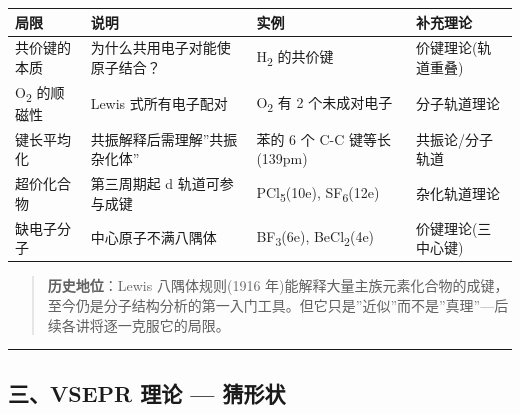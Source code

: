 {\def\LTcaptype{none} %
\begin{longtable}[]{@{}
  >{\raggedright\arraybackslash}p{}
  >{\raggedright\arraybackslash}p{}
  >{\raggedright\arraybackslash}p{}
  >{\centering\arraybackslash}p{}@{}}
\toprule\noalign{}
\begin{minipage}[b]{\linewidth}\raggedright
局限
\end{minipage} & \begin{minipage}[b]{\linewidth}\raggedright
说明
\end{minipage} & \begin{minipage}[b]{\linewidth}\raggedright
实例
\end{minipage} & \begin{minipage}[b]{\linewidth}\centering
补充理论
\end{minipage} \\
\midrule\noalign{}
\endhead
\bottomrule\noalign{}
\endlastfoot
共价键的本质 & 为什么共用电子对能使原子结合？ & H\textsubscript{2} 的共价键 & 价键理论(轨道重叠) \\
O\textsubscript{2} 的顺磁性 & Lewis 式所有电子配对 & O\textsubscript{2} 有 2 个未成对电子 & 分子轨道理论 \\
键长平均化 & 共振解释后需理解''共振杂化体'' & 苯的 6 个 C-C 键等长(139pm) & 共振论/分子轨道 \\
超价化合物 & 第三周期起 d 轨道可参与成键 & PCl\textsubscript{5}(10e), SF\textsubscript{6}(12e) & 杂化轨道理论 \\
缺电子分子 & 中心原子不满八隅体 & BF\textsubscript{3}(6e), BeCl\textsubscript{2}(4e) & 价键理论(三中心键) \\
\end{longtable}
}

\begin{quote}
\textbf{历史地位}：Lewis 八隅体规则(1916 年)能解释大量主族元素化合物的成键，至今仍是分子结构分析的第一入门工具。但它只是''近似''而不是''真理''---后续各讲将逐一克服它的局限。
\end{quote}

\begin{center}\rule{0.5\linewidth}{0.5pt}\end{center}

\subsection{三、VSEPR 理论 --- 猜形状}\label{ux4e09vsepr-ux7406ux8bba-ux731cux5f62ux72b6}

